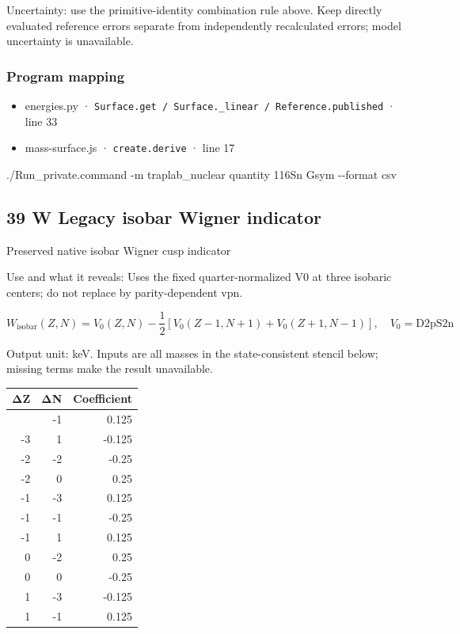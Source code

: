 \documentclass[
  11pt,
  letterpaper,
]{article}
\newenvironment{Shaded}{}{}
\newcommand{\AttributeTok}[1]{\textcolor[rgb]{0.49,0.56,0.16}{#1}}
\newcommand{\ExtensionTok}[1]{#1}
\newcommand{\NormalTok}[1]{#1}
\providecommand{\tightlist}{%
  \setlength{\itemsep}{0pt}\setlength{\parskip}{0pt}}
\begin{document}
Uncertainty: use the primitive-identity combination rule above. Keep
directly evaluated reference errors separate from independently
recalculated errors; model uncertainty is unavailable.

\subsubsection{Program mapping}\label{program-mapping-37}

\begin{itemize}
\tightlist
\item
  energies.py ·
  \texttt{Surface.get\ /\ Surface.\_linear\ /\ Reference.published} ·
  line 33
\item
  mass-surface.js · \texttt{create.derive} · line 17
\end{itemize}

\begin{Shaded}
\begin{Highlighting}[]
\ExtensionTok{./Run\_private.command} \AttributeTok{{-}m}\NormalTok{ traplab\_nuclear quantity 116Sn Gsym }\AttributeTok{{-}{-}format}\NormalTok{ csv}
\end{Highlighting}
\end{Shaded}

\subsection{39 W Legacy isobar Wigner
indicator}\label{w-legacy-isobar-wigner-indicator}

Preserved native isobar Wigner cusp indicator

Use and what it reveals: Uses the fixed quarter-normalized V0 at three
isobaric centers; do not replace by parity-dependent vpn.

\[
W_{\mathrm{isobar}}(Z,N)=V_0(Z,N)-\frac12[V_0(Z-1,N+1)+V_0(Z+1,N-1)],\quad V_0={\mathrm{D2pS2n}}
\]

Output unit: keV. Inputs are all masses in the state-consistent stencil
below; missing terms make the result unavailable.

\begin{longtable}[]{@{}rrr@{}}
\toprule\noalign{}
ΔZ & ΔN & Coefficient \\
\midrule\noalign{}
\endhead
\bottomrule\noalign{}
\endlastfoot
-3 & -1 & 0.125 \\
-3 & 1 & -0.125 \\
-2 & -2 & -0.25 \\
-2 & 0 & 0.25 \\
-1 & -3 & 0.125 \\
-1 & -1 & -0.25 \\
-1 & 1 & 0.125 \\
0 & -2 & 0.25 \\
0 & 0 & -0.25 \\
1 & -3 & -0.125 \\
1 & -1 & 0.125 \\
\end{longtable}
\end{document}
